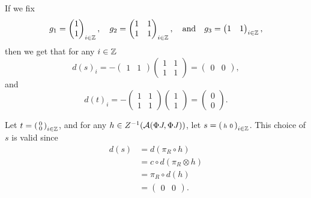 \begin{example}
    If we fix
    \[
        g_1 = \begin{pmatrix} 1 \\ 1 \end{pmatrix}_{i \in {\mathbb{Z}}}, \quad g_2 = \begin{pmatrix} 1 & 1 \\ 1 & 1 \end{pmatrix}_{i \in {\mathbb{Z}}}, \quad \text{and} \quad g_3 = \begin{pmatrix} 1 & 1 \end{pmatrix}_{i \in {\mathbb{Z}}},
    \]
    then we get that for any \( i \in {\mathbb{Z}} \)
    \[
        d(s)_i = - \begin{pmatrix} 1 & 1 \end{pmatrix} \begin{pmatrix} 1 & 1 \\ 1 & 1 \end{pmatrix} = \begin{pmatrix} 0 & 0 \end{pmatrix},
    \]
    and
    \[
        d(t)_i = - \begin{pmatrix} 1 & 1 \\ 1 & 1 \end{pmatrix} \begin{pmatrix} 1 \\ 1 \end{pmatrix} = \begin{pmatrix} 0 \\ 0 \end{pmatrix}.
    \]

    Let \( t = \begin{psmallmatrix} 0 \\ 0 \end{psmallmatrix}_{i \in {\mathbb{Z}}} \), and for any \( h \in Z^{-1}({\mathcal{A}}(\Phi J, \Phi J)) \), let \( s = \begin{psmallmatrix} h & 0 \end{psmallmatrix}_{i \in {\mathbb{Z}}} \). This choice of \( s \) is valid since
    \begin{align*}
        d(s) &= d( \pi_R \circ h ) \\
        &= c \circ d (\pi_R \otimes h) \\
        &= \pi_R \circ d(h) \\
        &= \begin{pmatrix} 0 & 0 \end{pmatrix}.
    \end{align*}
    

\end{example}
